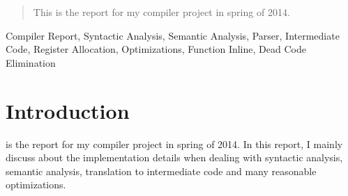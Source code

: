 \documentclass[journal]{IEEEtran}
\begin{document}




\maketitle


\begin{abstract}
This is the report for my compiler project in spring of 2014.
\end{abstract}

\begin{IEEEkeywords}
Compiler Report, Syntactic Analysis, Semantic Analysis, Parser, Intermediate Code, Register Allocation, Optimizations, Function Inline, Dead Code Elimination
\end{IEEEkeywords}



%
\IEEEpeerreviewmaketitle



\section{Introduction}
% 
% 
% 
% 
 is the report for my compiler project in spring of 2014.  In this report, I mainly discuss about the implementation details when dealing with syntactic analysis, semantic analysis, translation to intermediate code and many reasonable optimizations.
\end{document}
